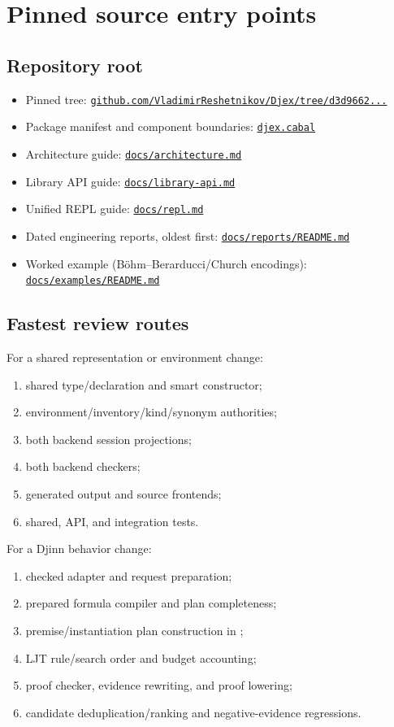 \documentclass[10pt,letterpaper,oneside]{report}
\newcommand{\code}[1]{\texttt{\detokenize{#1}}}
\def\DjexBase{https://github.com/VladimirReshetnikov/Djex/blob/d3d9662598460316bdcd177ce6768c521e764aa8/}
\newcommand{\dpath}[1]{\href{\DjexBase#1}{\nolinkurl{#1}}}
\begin{document}
\chapter{Pinned source entry points}\label{app:sources}

\section{Repository root}

\begin{itemize}
  \item Pinned tree: \href{https://github.com/VladimirReshetnikov/Djex/tree/d3d9662598460316bdcd177ce6768c521e764aa8}{\nolinkurl{github.com/VladimirReshetnikov/Djex/tree/d3d9662...}}
  \item Package manifest and component boundaries: \dpath{djex.cabal}
  \item Architecture guide: \dpath{docs/architecture.md}
  \item Library API guide: \dpath{docs/library-api.md}
  \item Unified REPL guide: \dpath{docs/repl.md}
  \item Dated engineering reports, oldest first: \dpath{docs/reports/README.md}
  \item Worked example (B\"ohm--Berarducci/Church encodings): \dpath{docs/examples/README.md}
\end{itemize}

\section{Fastest review routes}

For a shared representation or environment change:

\begin{enumerate}
  \item shared type/declaration and smart constructor;
  \item environment/inventory/kind/synonym authorities;
  \item both backend session projections;
  \item both backend checkers;
  \item generated output and source frontends;
  \item shared, API, and integration tests.
\end{enumerate}

For a Djinn behavior change:

\begin{enumerate}
  \item checked adapter and request preparation;
  \item prepared formula compiler and plan completeness;
  \item premise/instantiation plan construction in \code{Djinn.Core};
  \item LJT rule/search order and budget accounting;
  \item proof checker, evidence rewriting, and proof lowering;
  \item candidate deduplication/ranking and negative-evidence regressions.
\end{enumerate}
\end{document}
